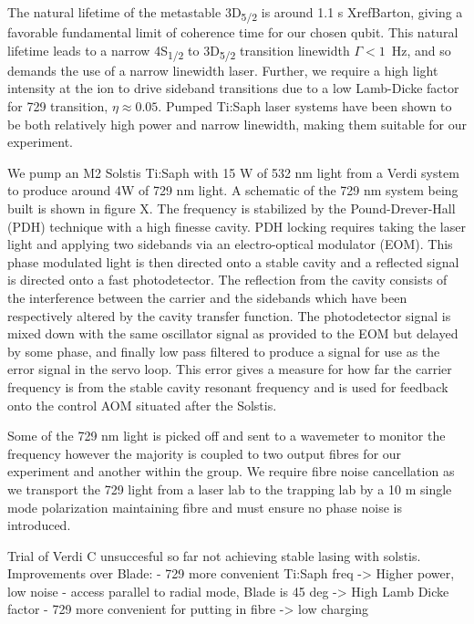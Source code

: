 \documentclass[12pt]{iopart}
\begin{document}
The natural lifetime of the metastable
3D\textsubscript{5/2} is around 1.1 s XrefBarton, giving a favorable
fundamental limit of coherence time for our chosen qubit.
This natural lifetime leads to a narrow 4S\textsubscript{1/2} to
3D\textsubscript{5/2} transition linewidth $\Gamma < 1$~Hz, and so
demands the use of a narrow linewidth laser. Further, we require a
high light intensity at the ion to drive sideband transitions due to a low
Lamb-Dicke factor for 729 transition, $\eta \approx 0.05$.
Pumped Ti:Saph laser systems have been shown to be both relatively
high power and narrow linewidth, making them suitable for our
experiment.

We pump an M2 Solstis Ti:Saph with 15 W of 532 nm light from a Verdi
system to produce around 4W of 729 nm light.  A schematic of the 729
nm system being built is shown in figure X. The frequency is
stabilized by the Pound-Drever-Hall (PDH) technique with a high
finesse cavity. PDH locking requires taking the laser light and
applying two sidebands via an electro-optical modulator (EOM). This
phase modulated light is then directed onto a stable cavity and a
reflected signal is directed onto a fast photodetector. The reflection
from the cavity consists of the interference between the carrier and
the sidebands which have been respectively altered by the cavity
transfer function. The photodetector signal is mixed down with the
same oscillator signal as provided to the EOM but delayed by some
phase, and finally low pass filtered to produce a signal for use as
the error signal in the servo loop.  This error gives a measure for
how far the carrier frequency is from the stable cavity resonant
frequency and is used for feedback onto the control AOM situated after
the Solstis.

Some of the 729 nm light is picked off and sent to a wavemeter to
monitor the frequency however the majority is coupled to two output
fibres for our experiment and another within the group. We require
fibre noise cancellation as we transport the 729 light from a laser
lab to the trapping lab by a 10 m single mode polarization maintaining
fibre and must ensure no phase noise is introduced.


Trial of Verdi C unsuccesful so far not achieving stable lasing with
solstis.
Improvements over Blade:
- 729 more convenient Ti:Saph freq -> Higher power, low noise
- access parallel to radial mode, Blade is 45 deg -> High Lamb Dicke
factor
- 729 more convenient for putting in fibre -> low charging
\end{document}
